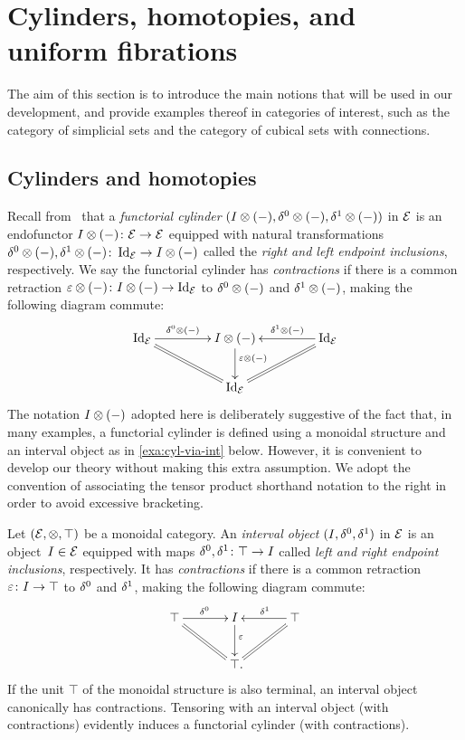\documentclass[reqno,10pt,a4paper,oneside]{amsart}
\begin{document}
\section{Cylinders, homotopies, and uniform fibrations}
\label{sec:cylhuf}

The aim of this section is to introduce the main notions that will be used in our development, and provide examples thereof in categories of interest, such as the category of simplicial sets and the category of cubical sets with connections.

\subsection*{Cylinders and homotopies}

Recall from~\cite{kamps-porter:homotopy} that a \emph{functorial cylinder} $(I \otimes (-), \delta^0 \otimes (-), \delta^1 \otimes (-))$ in $\mathcal{E}$ is an endofunctor $I \otimes (-) \colon \mathcal{E} \to \mathcal{E}$ equipped with natural transformations $\delta^0 \otimes (-), \delta^1 \otimes (-) \colon \operatorname{Id}_{\mathcal{E}} \to I \otimes (-)$ called the \emph{right and left endpoint inclusions}, respectively.
We say the functorial cylinder has \emph{contractions} if there is a common retraction $\varepsilon \otimes (-) \colon I \otimes (-) \to \operatorname{Id}_{\mathcal{E}}$ to $\delta^0 \otimes (-)$ and $\delta^1 \otimes (-)$, making the following diagram commute:
\[
\xymatrix@C+2em{
  \Id_\catE
  \ar[r]^-{\lcyl \otimes (-)}
  \ar@{=}[dr]
&
  \interval \otimes (-)
  \ar[d]^(0.4){\ccyl \otimes (-)}
&
  \Id_\catE
  \ar[l]_-{\rcyl \otimes (-)}
  \ar@{=}[dl]
\\&
  \Id_\catE
}
\]
The notation $I \otimes (-)$ adopted here is deliberately suggestive of the fact that, in many examples, a functorial cylinder is defined using a monoidal structure and an interval object as in \cref{exa:cyl-via-int} below.
However, it is convenient to develop our theory without making this extra assumption.
We adopt the convention of associating the tensor product shorthand notation to the right in order to avoid excessive bracketing.

\begin{example} \label{exa:cyl-via-int}
Let $(\mathcal{E}, \otimes, \top)$ be a monoidal category.
An \emph{interval object} $(I, \delta^0, \delta^1)$ in $\mathcal{E}$ is an object~$I \in \mathcal{E}$ equipped with maps $\delta^0, \delta^1 \colon \top \to I$ called \emph{left and right endpoint inclusions}, respectively.
It has \emph{contractions} if there is a common retraction $\varepsilon \colon I \to \top$ to $\delta^0$ and $\delta^1$, making the following diagram commute:
\[
\xymatrix@C+1em{
  \top
  \ar[r]^{\lcyl}
  \ar@{=}[dr]
&
  \interval
  \ar[d]^(0.4){\ccyl}
&
  \top
  \ar[l]_{\rcyl}
  \ar@{=}[dl]
\\&
  \top
\rlap{.}}
\]
If the unit $\top$ of the monoidal structure is also terminal, an interval object canonically has contractions.
Tensoring with an interval object (with contractions) evidently induces a functorial cylinder (with contractions).
\end{example}
\end{document}
